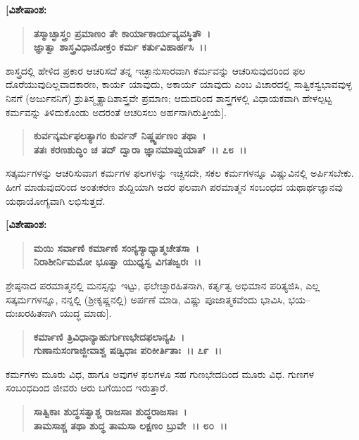\begin{flushleft}
\textbf{[ವಿಶೇಷಾಂಶ:} 
\end{flushleft}

\begin{verse}
\textbf{ತಸ್ಮಾಚ್ಛಾಸ್ತ್ರಂ ಪ್ರಮಾಣಂ ತೇ ಕಾರ್ಯಾಕಾರ್ಯವ್ಯವಸ್ಥಿತೌ~।}\\\textbf{ಜ್ಞಾತ್ವಾ ಶಾಸ್ತ್ರವಿಧಾನೋಕ್ತಂ ಕರ್ಮ ಕರ್ತುವಿಹಾರ್ಹಸಿ~।।} 
\end{verse}

ಶಾಸ್ತ್ರದಲ್ಲಿ ಹೇಳಿದ ಪ್ರಕಾರ ಆಚರಿಸದೆ ತನ್ನ ಇಚ್ಛಾನುಸಾರವಾಗಿ ಕರ್ಮವನ್ನು ಆಚರಿಸುವುದರಿಂದ ಫಲ ದೊರೆಯುವುದಿಲ್ಲವಾದಕಾರಣ, ಕಾರ್ಯ ಯಾವುದು, ಅಕಾರ್ಯ ಯಾವುದು ಎಂಬ ವಿಚಾರದಲ್ಲಿ ಸಾತ್ವಿಕಸ್ವಭಾವವುಳ್ಳ ನಿನಗೆ (ಅರ್ಜುನನಿಗೆ) ಶ್ರುತಿಸ್ಮೃತ್ಯಾದಿಶಾಸ್ತ್ರವೇ ಪ್ರಮಾಣ; ಆದುದರಿಂದ ಶಾಸ್ತ್ರಗಳಲ್ಲಿ ವಿಧಾಯಕವಾಗಿ ಹೇಳಲ್ಪಟ್ಟ ಕರ್ಮವನ್ನು ತಿಳಿದುಕೊಂಡು ಅದರಂತೆ ಆಚರಿಸಲು ಅರ್ಹನಾಗಿರುತ್ತೀಯೆ].

\begin{verse}
\textbf{ಕುರ್ವನ್ಕರ್ಮಫಲತ್ಯಾಗಂ ಕುರ್ವನ್ ನಿಷ್ಣ್ವರ್ಪಣಂ ತಥಾ~।}\\\textbf{ತತಃ ಕರಣಶುದ್ಧಿಂ ಚ ತದ್ ದ್ವಾರಾ ಜ್ಞಾನಮಾಪ್ನುಯಾತ್~।। ೭೮~।।}
\end{verse}

ಸತ್ಕರ್ಮಗಳನ್ನು ಆಚರಿಸುವಾಗ ಕರ್ಮಗಳ ಫಲಗಳನ್ನು ಇಚ್ಚಿಸದೇ, ಸಕಲ ಕರ್ಮಗಳನ್ನೂ ವಿಷ್ಣುವಿನಲ್ಲಿ ಅರ್ಪಿಸಬೇಕು. ಹೀಗೆ ಮಾಡುವುದರಿಂದ ಅಂತಃಕರಣ ಶುದ್ದಿಯಾಗಿ ಅದರ ಫಲವಾಗಿ ಪರಮಾತ್ಮನ ಸಂಬಂಧದ ಯಥಾರ್ಥಜ್ಞಾನವು ಯಥಾಯೋಗ್ಯವಾಗಿ ಲಭಿಸುತ್ತದೆ.

\begin{flushleft}
\textbf{[ವಿಶೇಷಾಂಶ:} 
\end{flushleft}

\begin{verse}
\textbf{ಮಯಿ ಸರ್ವಾಣಿ ಕರ್ಮಾಣಿ ಸಂನ್ಯಸ್ಯಾಧ್ಯಾತ್ಮಚೇತಸಾ~।}\\\textbf{ನಿರಾಶೀರ್ನಿಮಮೋ ಭೂತ್ವಾ ಯುಧ್ಯಸ್ವ ವಿಗತಜ್ವರಃ~।।} 
\end{verse}

ಶ್ರೇಷ್ಠನಾದ ಪರಮಾತ್ಮನಲ್ಲಿ ಮನಸ್ಸನ್ನು ಇಟ್ಟು, ಫಲೇಚ್ಛಾರಹಿತನಾಗಿ, ಕರ್ತೃತ್ವ ಅಭಿಮಾನ ಪರಿತ್ಯಜಿಸಿ, ಎಲ್ಲ ಸತ್ಕರ್ಮಗಳನ್ನೂ, ನನ್ನಲ್ಲಿ (ಶ‍್ರೀಕೃಷ್ಣನಲ್ಲಿ) ಅರ್ಪಣೆ ಮಾಡಿ, ವಿಷ್ಣು ಪೂಜಾತ್ಮಕವೆಂದು ಭಾವಿಸಿ, ಭಯ–ದುಃಖರಹಿತನಾಗಿ ಯುದ್ಧ ಮಾಡು].

\begin{verse}
\textbf{ಕರ್ಮಾಣಿ ತ್ರಿವಿಧಾನ್ಯಾಹುರ್ಗುಣಭೇದಫಲಾನ್ಯಪಿ~।}\\\textbf{ಗುಣಾನುಸಂಗಾಜ್ಜೀವಾಶ್ಚ ಷಡ್ವಿಧಾಃ ಪರಿಕೀರ್ತಿತಾಃ~।। ೭೯~।।}
\end{verse}

ಕರ್ಮಗಳು ಮೂರು ವಿಧ, ಹಾಗೂ ಅವುಗಳ ಫಲಗಳೂ ಸಹ ಗುಣಭೇದದಿಂದ ಮೂರು ವಿಧ. ಗುಣಗಳ ಸಂಬಂಧದಿಂದ ಜೀವರು ಆರು ಬಗೆಯಿಂದ ಇರುತ್ತಾರೆ.

\begin{verse}
\textbf{ಸಾತ್ವಿಕಾಃ ಶುದ್ಧಸತ್ವಾಶ್ಚ ರಾಜಸಾಃ ಶುದ್ಧರಾಜಸಾಃ~।}\\\textbf{ತಾಮಸಾಶ್ಚ ತಥಾ ಶುದ್ಧ ತಾಮಸಾ ಲಕ್ಷಣಂ ಬ್ರುವೇ~।। ೮೦~।।}
\end{verse}


